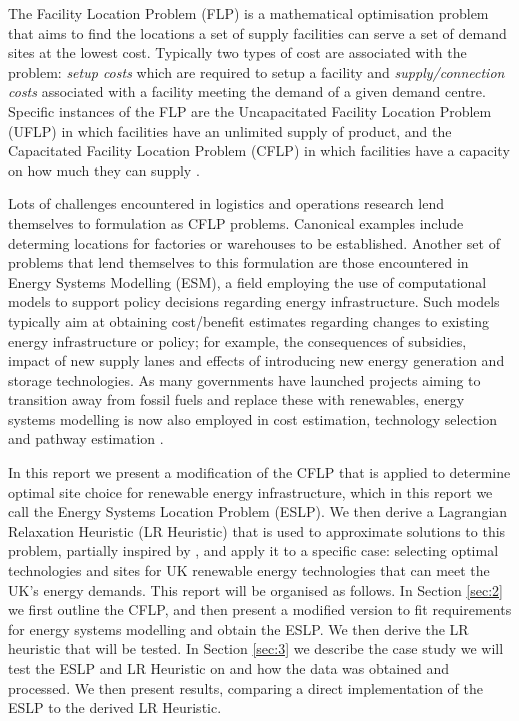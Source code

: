 The Facility Location Problem (FLP) is a mathematical optimisation problem that aims 
to find the locations  a set of supply facilities can serve a set of demand sites at the lowest cost. 
Typically two types of cost are associated with the problem: 
\textit{setup costs} which are required to setup a facility and 
\textit{supply/connection costs} associated
with a facility meeting the demand of a given demand centre. Specific instances of the FLP 
are the Uncapacitated Facility Location Problem (UFLP) in which facilities have an unlimited supply of product, and 
the Capacitated Facility Location Problem (CFLP) in which facilities have a capacity on how much 
they can supply \cite{wu2006capacitated}. \par

Lots of challenges encountered in logistics and operations research lend themselves to 
formulation as CFLP problems. Canonical examples include determing locations for factories or warehouses 
to be established. Another set of problems that lend themselves to this formulation are those encountered in 
Energy Systems Modelling (ESM), a field employing the use of computational models to support policy
decisions regarding energy infrastructure. Such models typically aim at obtaining cost/benefit estimates
regarding changes to existing energy infrastructure or policy; for example, the consequences of subsidies, impact of new supply lanes 
and effects of introducing new energy generation and storage technologies. As many governments have
launched projects aiming to transition away from fossil fuels and replace these with renewables, 
energy systems modelling is now also employed in cost estimation, technology selection and pathway
estimation \cite{hoffmann2024review} \cite{nakata2011application}.\par

In this report we present a modification of the CFLP that is applied to determine optimal site choice 
for renewable energy infrastructure, which in this report we call the Energy Systems Location Problem (ESLP).
We then derive a Lagrangian Relaxation Heuristic (LR Heuristic) that is used to approximate solutions to this problem,
partially inspired by \cite{wu2006capacitated}, and apply it to a specific case: selecting optimal technologies and sites for UK 
renewable energy technologies that can meet the UK's energy demands. This report will be organised as follows. 
In Section \ref{sec:2} we first outline the CFLP, and then present a modified version to fit requirements for energy systems modelling 
and obtain the ESLP. We then derive the LR heuristic that will be tested. In Section \ref{sec:3} we describe the
case study we will test the ESLP and LR Heuristic on and how the data was obtained and processed.
We then present results, comparing a direct implementation of the ESLP to the derived LR Heuristic.


